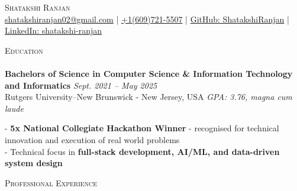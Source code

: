 \documentclass[a4paper]{article}
\newcommand{\lineunder} {
    \vspace*{-8pt} \\
    \hspace*{-18pt} \hrulefill \\
}
\newcommand{\header} [1] {
    {\hspace*{-18pt}\vspace*{6pt} \textsc{#1}}
    \vspace*{-6pt} \lineunder
}
\begin{document}
\vspace*{-35pt}

\begin{center}
{\Large \scshape Shatakshi Ranjan}\\
\vspace{2pt}
\small{ \href{mailto:shatakshiranjan02@gmail.com}{shatakshiranjan02@gmail.com}  | \href{tel:6097215507}{+1(609)721-5507} | \href{https://github.com/ShatakshiRanjan}{GitHub: ShatakshiRanjan}  | \href{https://www.linkedin.com/in/shatakshi-ranjan/}{LinkedIn: shatakshi-ranjan}}\\
\end{center}
\vspace{-4pt} 

%
%
\header{Education}
\textbf{Bachelors of Science in Computer Science \& Information Technology and Informatics} \hfill \textit{Sept. 2021 – May 2025} \\
Rutgers University–New Brunswick - New Jersey, USA \hfill \textit{GPA: 3.76, magna cum laude}

  \vspace{1mm}
  - \textbf{5x National Collegiate Hackathon Winner} - recognised for technical innovation and execution of real world problems \\
  - Technical focus in \textbf{full-stack development, AI/ML, and data-driven system design}  \\

  \vspace{1mm}
%
%
\header{Professional Experience}
\end{document}
